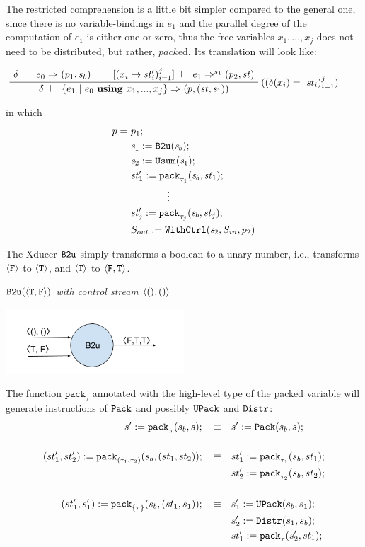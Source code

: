 The restricted comprehension is a little bit simpler compared to the general one, since there is no variable-bindings in $e_1$ and the parallel degree of the computation of $e_1$ is either one or zero, thus the free variables $x_1,...,x_j$ does not need to be distributed, but rather, $pack$ed. Its translation will look like:

$$\PT{
	\AC{\Trans{\del}{e_0}{}{}{(p_1,s_b)}}
	\AC{\Trans{[\j{x_i \|-> \st'_i}]}{e_1}{s_1}{}{\sfun{p_2}{\st}}}
	\RiLa{(\j{\del(x_i) = \ \st_i})}		
	\BC{\Trans{\del}{\RComp{e_1}{e_0}{\usevars}}{}{}
		{ \sfun{p} {(\st,\s_1)}}}
}$$


in which $$ \begin{aligned}
p = & \ p_1; \\
& \ \sdef{\s_1}{\bu(\s_b)}; \\
& \ \sdef{\s_2}{\usum(\s_1)}; \\
& \ \sdef{\st_1'}{\Pack{\s_b}{\st_1}{\tau_1}}; \\
& \qquad \qquad \vdots \\
& \ \sdef{\st_j'}{\Pack{\s_b}{\st_j}{\tau_j}}; \\
& \ \withctrl{\s_2}{p_2}{\Sin}{\Sout} \\
\end{aligned}$$
	
The Xducer $\bu$ simply transforms a boolean to a unary number, i.e.,  transforms $\oF$ to $\oT$, and $\oT$ to $\< \F, \T \'>$.
\begin{example} \emph{$\bu({\<\T,\F\'>})$ with control stream $\< (),() \'>$}\\
	\begin{center}
		\includegraphics[width=0.5\textwidth]{fig/b2uxducer.png}
	\end{center}
\end{example}

The function $\mathtt{pack}_{\tau}$ annotated with the high-level type of the packed variable will generate instructions of $\pack$ and possibly $\upack$ and $\distr$:
\begin{align*}
s' := \Pack{s_b}{s}{\pi}; \quad \equiv & \quad s' := \packf{s_b}{s}; \\
\\
(st'_1,st'_2)  := \Pack{s_b}{(st_1,st_2)}{(\tau_1,\tau_2)}; \quad \equiv & \quad st_1' := \Pack{s_b}{st_1}{\tau_1}; \\ 
&\quad st_2' := \Pack{s_b}{st_2}{\tau_2};\\
\\
(st'_1,s_1')  := \Pack{s_b}{(st_1,s_1)}{\{\tau\}}; \quad \equiv & \quad s_1' := \upackf{s_b}{s_1}; \\ 
&\quad s_2' := \distrf{s_1}{s_b};\\
&\quad st_1' := \Pack{s_2'}{st_1}{\tau};
\end{align*}

